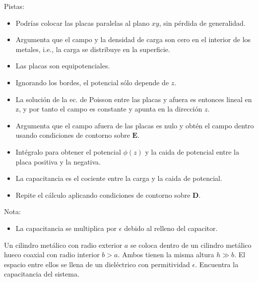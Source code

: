 \documentclass{exam}
\begin{document}
\begin{questions}
  Pistas:
  \begin{itemize}
  \item Podrías colocar las placas paralelas al plano $xy$, sin pérdida de
    generalidad.
  \item Argumenta que el campo y la densidad de carga son cero en el
    interior de los metales, i.e., la carga se distribuye en la superficie.
  \item Las placas son equipotenciales.
  \item Ignorando los bordes, el potencial sólo depende de $z$.
  \item La solución de la ec. de Poisson entre las placas y afuera es
    entonces lineal en z, y por tanto el campo es constante y apunta
    en la dirección $z$.
  \item Argumenta que el campo afuera de las placas es nulo y obtén el
    campo dentro usando condiciones de contorno sobre $\bm E$.
  \item Intégralo para obtener el potencial $\phi(z)$ y la caida de
    potencial entre la placa positiva y la negativa.
  \item La capacitancia es el cociente entre la carga y la caida de
    potencial.
  \item Repite el cálculo aplicando condiciones de contorno sobre $\bm
    D$.
  \end{itemize}
  Nota:
  \begin{itemize}
  \item La capacitancia se multiplica por $\epsilon$ debido al relleno
    del capacitor.
  \end{itemize}
  \question Un cilindro metálico con radio exterior $a$ se coloca
  dentro de un cilindro metálico hueco coaxial con radio interior $b>a$. Ambos
  tienen la misma altura $h\gg b$. El espacio entre ellos se llena de un
  dieléctrico con permitividad $\epsilon$. Encuentra la capacitancia del
  sistema.


\end{questions}
\end{document}

